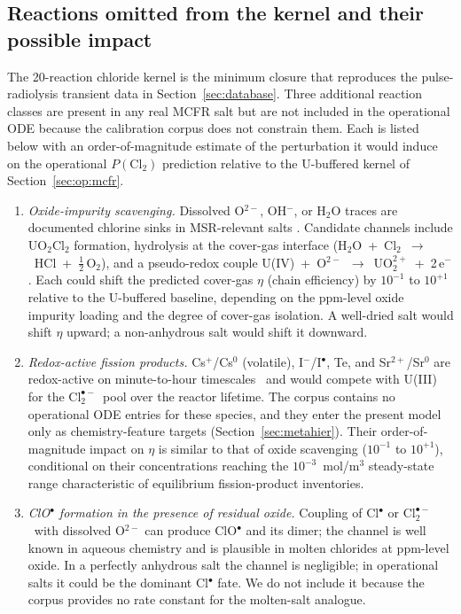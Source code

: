 \documentclass[11pt]{article}
\theoremstyle{plain}
\theoremstyle{definition}
\theoremstyle{remark}
\newcommand{\Clt}{\ensuremath{\mathrm{Cl}_2^{\bullet-}}\xspace}
\begin{document}
\subsection{Reactions omitted from the kernel and their possible impact}
\label{sec:cl:omitted}

The 20-reaction chloride kernel is the minimum closure that reproduces the
pulse-radiolysis transient data in Section~\ref{sec:database}.  Three
additional reaction classes are present in any real MCFR salt but are not
included in the operational ODE because the calibration corpus does not
constrain them.  Each is listed below with an order-of-magnitude estimate
of the perturbation it would induce on the operational $P(\mathrm{Cl}_2)$
prediction relative to the U-buffered kernel of
Section~\ref{sec:op:mcfr}.

\begin{enumerate}
\item \emph{Oxide-impurity scavenging.}  Dissolved O$^{2-}$, OH$^-$, or
      H$_2$O traces are documented chlorine sinks in MSR-relevant salts
      \citep{Forsberg2020,CastroBaldivieso2026}.  Candidate channels include
      UO$_2$Cl$_2$ formation, hydrolysis at the cover-gas interface
      (H$_2$O~+~Cl$_2$~$\to$~HCl~+~$\tfrac12$\,O$_2$), and a pseudo-redox
      couple U(IV)~+~O$^{2-}$~$\to$~UO$_2^{2+}$~+~2\,e$^-$.  Each could
      shift the predicted cover-gas $\eta$ (chain efficiency) by
      $10^{-1}$ to $10^{+1}$ relative to the U-buffered baseline,
      depending on the ppm-level oxide impurity loading and the degree
      of cover-gas isolation.  A well-dried salt would shift $\eta$
      upward; a non-anhydrous salt would shift it downward.
\item \emph{Redox-active fission products.}  Cs$^+$/Cs$^0$ (volatile),
      I$^-$/I$^{\bullet}$, Te, and Sr$^{2+}$/Sr$^0$ are redox-active on
      minute-to-hour timescales~\citep{Briggs1964,CastroBaldivieso2026} and would
      compete with U(III) for the \Clt\ pool over the reactor lifetime.
      The corpus contains no operational ODE entries for these species,
      and they enter the present model only as chemistry-feature targets
      (Section~\ref{sec:metahier}).  Their order-of-magnitude impact on
      $\eta$ is similar to that of oxide scavenging
      ($10^{-1}$ to $10^{+1}$), conditional on their concentrations
      reaching the $10^{-3}$~mol/m$^3$ steady-state range characteristic
      of equilibrium fission-product inventories.
\item \emph{ClO$^\bullet$ formation in the presence of residual oxide.}
      Coupling of Cl$^{\bullet}$ or \Clt\ with dissolved O$^{2-}$ can
      produce ClO$^{\bullet}$ and its dimer; the channel is well known
      in aqueous chemistry and is plausible in molten chlorides at
      ppm-level oxide.  In a perfectly anhydrous salt the channel is
      negligible; in operational salts it could be the dominant
      Cl$^{\bullet}$ fate.  We do not include it because the corpus
      provides no rate constant for the molten-salt analogue.
\end{enumerate}
\end{document}
